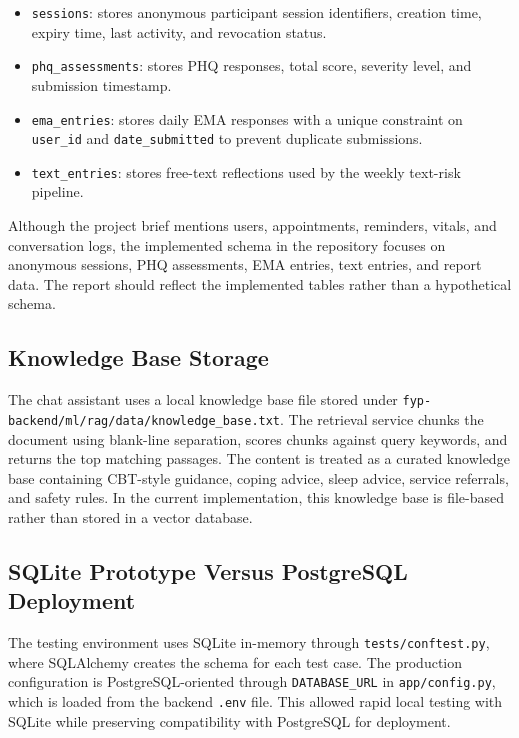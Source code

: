 \begin{itemize}
  \item \texttt{sessions}: stores anonymous participant session identifiers, creation time, expiry time, last activity, and revocation status.
  \item \texttt{phq\_assessments}: stores PHQ responses, total score, severity level, and submission timestamp.
  \item \texttt{ema\_entries}: stores daily EMA responses with a unique constraint on \texttt{user\_id} and \texttt{date\_submitted} to prevent duplicate submissions.
  \item \texttt{text\_entries}: stores free-text reflections used by the weekly text-risk pipeline.
\end{itemize}

Although the project brief mentions users, appointments, reminders, vitals, and conversation logs, the implemented schema in the repository focuses on anonymous sessions, PHQ assessments, EMA entries, text entries, and report data. The report should reflect the implemented tables rather than a hypothetical schema.

\subsection{Knowledge Base Storage}

The chat assistant uses a local knowledge base file stored under \texttt{fyp-backend/ml/rag/data/knowledge\_base.txt}. The retrieval service chunks the document using blank-line separation, scores chunks against query keywords, and returns the top matching passages. The content is treated as a curated knowledge base containing CBT-style guidance, coping advice, sleep advice, service referrals, and safety rules. In the current implementation, this knowledge base is file-based rather than stored in a vector database.

\subsection{SQLite Prototype Versus PostgreSQL Deployment}

The testing environment uses SQLite in-memory through \texttt{tests/conftest.py}, where SQLAlchemy creates the schema for each test case. The production configuration is PostgreSQL-oriented through \texttt{DATABASE\_URL} in \texttt{app/config.py}, which is loaded from the backend \texttt{.env} file. This allowed rapid local testing with SQLite while preserving compatibility with PostgreSQL for deployment.

